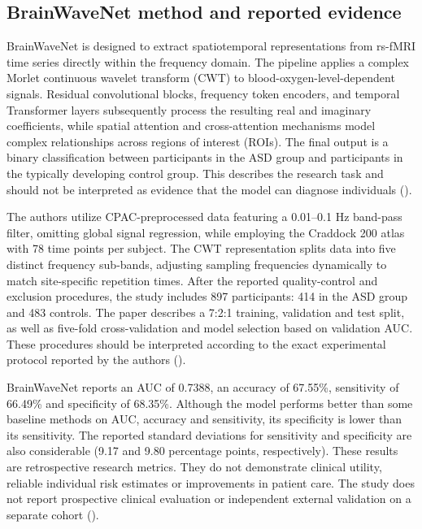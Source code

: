 \documentclass[11pt,a4paper]{article}
\begin{document}
\subsection{BrainWaveNet method and reported evidence}
BrainWaveNet is designed to extract spatiotemporal representations from rs-fMRI time series directly within the frequency domain. The pipeline applies a complex Morlet continuous wavelet transform (CWT) to blood-oxygen-level-dependent signals. Residual convolutional blocks, frequency token encoders, and temporal Transformer layers subsequently process the resulting real and imaginary coefficients, while spatial attention and cross-attention mechanisms model complex relationships across regions of interest (ROIs). The final output is a binary classification between participants in the ASD group and participants in the typically developing control group. This describes the research task and should not be interpreted as evidence that the model can diagnose individuals (\cite{jeong2024}).

The authors utilize CPAC-preprocessed data featuring a 0.01--0.1 Hz band-pass filter, omitting global signal regression, while employing the Craddock 200 atlas with 78 time points per subject. The CWT representation splits data into five distinct frequency sub-bands, adjusting sampling frequencies dynamically to match site-specific repetition times. After the reported quality-control and exclusion procedures, the study includes 897 participants: 414 in the ASD group and 483 controls. The paper describes a 7:2:1 training, validation and test split, as well as five-fold cross-validation and model selection based on validation AUC. These procedures should be interpreted according to the exact experimental protocol reported by the authors (\cite{jeong2024}).

BrainWaveNet reports an AUC of 0.7388, an accuracy of 67.55\%, sensitivity of 66.49\% and specificity of 68.35\%. Although the model performs better than some baseline methods on AUC, accuracy and sensitivity, its specificity is lower than its sensitivity. The reported standard deviations for sensitivity and specificity are also considerable (9.17 and 9.80 percentage points, respectively). These results are retrospective research metrics. They do not demonstrate clinical utility, reliable individual risk estimates or improvements in patient care. The study does not report prospective clinical evaluation or independent external validation on a separate cohort (\cite{jeong2024}).
\end{document}
